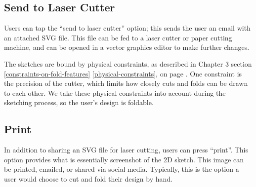 \subsection{Send to Laser Cutter}\label{send-to-laser-cutter}

Users can tap the ``send to laser cutter'' option; this sends the user
an email with an attached SVG file. This file can be fed to a laser
cutter or paper cutting machine, and can be opened in a vector graphics
editor to make further changes.

The sketches are bound by physical constraints, as described in Chapter
3 section \ref{constraints-on-fold-features} \ref{physical-constraints},
 on page \pageref{physical-constraints}.
One constraint is the precision of the cutter, which limits how closely
cuts and folds can be drawn to each other. We take these physical
constraints into account during the sketching process, so the user's
design is foldable.

\subsection{Print}\label{print}

In addition to sharing an SVG file for laser cutting, users can press
``print''. This option provides what is essentially screenshot of the 2D
sketch. This image can be printed, emailed, or shared via social media.
Typically, this is the option a user would choose to cut and fold their
design by hand.

